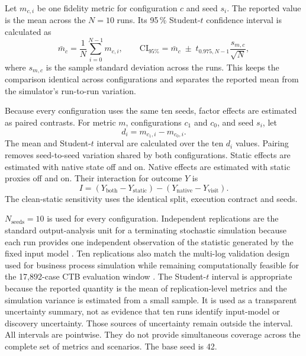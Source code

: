 Let $m_{c,i}$ be one fidelity metric for configuration $c$ and seed $s_i$.
The reported value is the mean across the $N=10$ runs. Its 95\,\% Student-$t$
confidence interval is calculated as
\begin{equation}
    \bar{m}_c=\frac{1}{N}\sum_{i=0}^{N-1}m_{c,i},
    \qquad
    \mathrm{CI}_{95\%}=\bar{m}_c \;\pm\;
    t_{0.975,N-1}\frac{s_{m,c}}{\sqrt{N}},
\end{equation}
where $s_{m,c}$ is the sample standard deviation across the runs. This keeps
the comparison identical across configurations and separates the reported
mean from the simulator's run-to-run variation.

Because every configuration uses the same ten seeds, factor effects are
estimated as paired contrasts. For metric $m$, configurations $c_1$ and
$c_0$, and seed $s_i$, let
\begin{equation}
d_i=m_{c_1,i}-m_{c_0,i}.
\end{equation}
The mean and Student-$t$ interval are calculated over the ten $d_i$ values.
Pairing removes seed-to-seed variation shared by both configurations. Static
effects are estimated with native state off and on. Native effects are
estimated with static proxies off and on. Their interaction for outcome $Y$
is
\begin{equation}
 I=(Y_{\mathrm{both}}-Y_{\mathrm{static}})
   -(Y_{\mathrm{native}}-Y_{\mathrm{visit}}).
\end{equation}
The clean-static sensitivity uses the identical split, execution contract and
seeds.

\(N_{\text{seeds}}=10\) is used for every configuration. Independent
replications are the standard output-analysis unit for a terminating
stochastic simulation because each run provides one independent observation
of the statistic generated by the fixed input model \cite{Law2015Simulation}.
Ten replications also match the multi-log validation design used for business
process simulation while remaining computationally feasible for the
17,892-case CTB evaluation window \cite{ChapelaCampa2023Trust}. The
Student-$t$ interval is appropriate because the reported quantity is the mean
of replication-level metrics and the simulation variance is estimated from a
small sample. It is used as a transparent uncertainty summary, not as evidence
that ten runs identify input-model or discovery uncertainty. Those sources of
uncertainty remain outside the interval. All intervals are pointwise. They do
not provide simultaneous coverage across the complete set of metrics and
scenarios. The base seed is 42.

